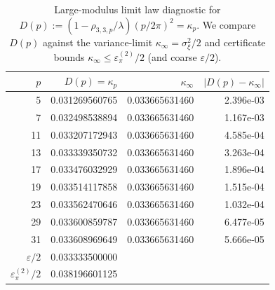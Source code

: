 \begin{table}[H]
\centering
\scriptsize
\setlength{\tabcolsep}{6pt}
\caption{Large-modulus limit law diagnostic for $D(p):=(1-\rho_{3,3,p}/\lambda)(p/2\pi)^2=\kappa_p$. We compare $D(p)$ against the variance-limit $\kappa_\infty=\sigma_\xi^2/2$ and certificate bounds $\kappa_\infty\le \varepsilon_\pi^{(2)}/2$ (and coarse $\varepsilon/2$).}
\label{tab:real_input_40_arity_335_n2_limit_law}
\begin{tabular}{r r r r}
\toprule
$p$ & $D(p)=\kappa_p$ & $\kappa_\infty$ & $|D(p)-\kappa_\infty|$\\
\midrule
5 & 0.031269560765 & 0.033665631460 & 2.396e-03\\
7 & 0.032498538894 & 0.033665631460 & 1.167e-03\\
11 & 0.033207172943 & 0.033665631460 & 4.585e-04\\
13 & 0.033339350732 & 0.033665631460 & 3.263e-04\\
17 & 0.033476032929 & 0.033665631460 & 1.896e-04\\
19 & 0.033514117858 & 0.033665631460 & 1.515e-04\\
23 & 0.033562470646 & 0.033665631460 & 1.032e-04\\
29 & 0.033600859787 & 0.033665631460 & 6.477e-05\\
31 & 0.033608969649 & 0.033665631460 & 5.666e-05\\
\midrule
$\varepsilon/2$ & \multicolumn{3}{l}{0.033333500000}\\
$\varepsilon_\pi^{(2)}/2$ & \multicolumn{3}{l}{0.038196601125}\\
\bottomrule
\end{tabular}
\end{table}
